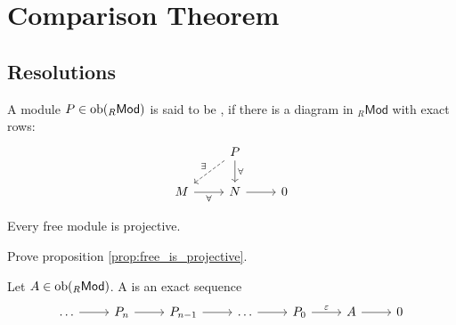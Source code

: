 \section*{Comparison Theorem}
\subsection*{Resolutions}

\begin{definition}
	A module $P \in \operatorname{ob}(_{R}\mathsf{Mod})$ is said to be , if there is a diagram in $_{R}\mathsf{Mod}$ with exact rows: 
	\begin{equation*}
		\begin{tikzcd}
			& P \arrow[d,"\forall"]\arrow[dl,dashed,"\exists"']\\
			M \arrow[r,"\forall"'] & N \arrow[r] & 0
		\end{tikzcd}
	\end{equation*}
\end{definition}

\begin{proposition}
	Every free module is projective.
	\label{prop:free_is_projective}
\end{proposition}

\begin{exercise}
	Prove proposition \ref{prop:free_is_projective}.
\end{exercise}

\begin{definition}
	Let $A \in \operatorname{ob}(_{R}\mathsf{Mod})$. A  is an exact sequence 
	\begin{equation*}
		\begin{tikzcd}
			\dots \arrow[r] & P_n \arrow[r] & P_{n - 1} \arrow[r] & \dots \arrow[r] & P_0 \arrow[r,"\varepsilon"] & A \arrow[r] & 0 
		\end{tikzcd}
	\end{equation*}
\end{definition}
